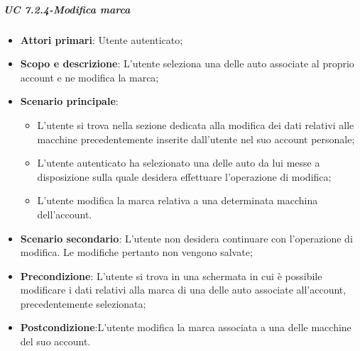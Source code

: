     
    \subparagraph{UC 7.2.4-Modifica marca}
            \begin{itemize}
                \item \textbf{Attori primari}: Utente autenticato;
               
                \item \textbf{Scopo e descrizione}: L'utente seleziona una delle auto associate al proprio account e ne modifica la marca; 
                \item \textbf{Scenario principale}:
                    \begin{itemize}
                        \item L'utente si trova nella sezione dedicata alla modifica dei dati relativi alle macchine precedentemente inserite dall'utente nel suo account personale;
                        \item L'utente autenticato ha selezionato una delle auto da lui messe a disposizione sulla quale desidera effettuare l'operazione di modifica;
                        \item L'utente modifica la marca relativa a una determinata macchina dell'account.
                    \end{itemize}
                \item \textbf{Scenario secondario}: L'utente non desidera continuare con l'operazione di modifica. Le modifiche pertanto non vengono salvate;
        
                \item \textbf{Precondizione}: L'utente si trova in una schermata in cui è possibile modificare i dati relativi alla marca di una delle auto associate all'account, precedentemente selezionata;
                \item \textbf{Postcondizione}:L'utente modifica la marca associata a una delle macchine del suo account.
            \end{itemize}
    
